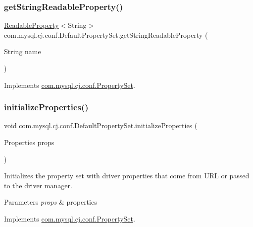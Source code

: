 \subsubsection{\texorpdfstring{get\+String\+Readable\+Property()}{getStringReadableProperty()}}
{\footnotesize\ttfamily \mbox{\hyperlink{interfacecom_1_1mysql_1_1cj_1_1conf_1_1_readable_property}{Readable\+Property}}$<$String$>$ com.\+mysql.\+cj.\+conf.\+Default\+Property\+Set.\+get\+String\+Readable\+Property (\begin{DoxyParamCaption}\item[{String}]{name }\end{DoxyParamCaption})}



Implements \mbox{\hyperlink{interfacecom_1_1mysql_1_1cj_1_1conf_1_1_property_set_ada03117e402138c98ba25e336e83d9a2}{com.\+mysql.\+cj.\+conf.\+Property\+Set}}.

\mbox{\label{classcom_1_1mysql_1_1cj_1_1conf_1_1_default_property_set_aca8a98e7e0fa72d07fde37a0e7b03fbe}} 
\subsubsection{\texorpdfstring{initialize\+Properties()}{initializeProperties()}}
{\footnotesize\ttfamily void com.\+mysql.\+cj.\+conf.\+Default\+Property\+Set.\+initialize\+Properties (\begin{DoxyParamCaption}\item[{Properties}]{props }\end{DoxyParamCaption})}

Initializes the property set with driver properties that come from U\+RL or passed to the driver manager.


\begin{DoxyParams}{Parameters}
{\em props} & properties \\
\hline
\end{DoxyParams}


Implements \mbox{\hyperlink{interfacecom_1_1mysql_1_1cj_1_1conf_1_1_property_set_a4d0959318c1dd50f8d73a4aabcacd2ae}{com.\+mysql.\+cj.\+conf.\+Property\+Set}}.

